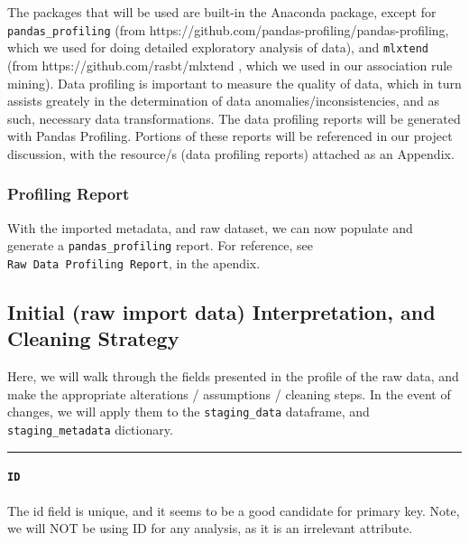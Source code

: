 \documentclass[11pt]{article}
\begin{document}
The packages that will be used are built-in the Anaconda package, except
for \texttt{pandas\_profiling} (from
https://github.com/pandas-profiling/pandas-profiling, which we used for
doing detailed exploratory analysis of data), and \texttt{mlxtend} (from
https://github.com/rasbt/mlxtend , which we used in our association rule
mining). Data profiling is important to measure the quality of data,
which in turn assists greately in the determination of data
anomalies/inconsistencies, and as such, necessary data transformations.
The data profiling reports will be generated with Pandas Profiling.
Portions of these reports will be referenced in our project discussion,
with the resource/s (data profiling reports) attached as an Appendix.

    \hypertarget{profiling-report}{%
\subsubsection{Profiling Report}\label{profiling-report}}

With the imported metadata, and raw dataset, we can now populate and
generate a \texttt{pandas\_profiling} report. For reference, see
\texttt{Raw\ Data\ Profiling\ Report}, in the apendix.

    

    \hypertarget{initial-raw-import-data-interpretation-and-cleaning-strategy}{%
\subsection{Initial (raw import data) Interpretation, and Cleaning
Strategy}\label{initial-raw-import-data-interpretation-and-cleaning-strategy}}

Here, we will walk through the fields presented in the profile of the
raw data, and make the appropriate alterations / assumptions / cleaning
steps. In the event of changes, we will apply them to the
\texttt{staging\_data} dataframe, and \texttt{staging\_metadata}
dictionary.

    \begin{center}\rule{0.5\linewidth}{0.5pt}\end{center}

\hypertarget{id}{%
\paragraph{\texorpdfstring{\texttt{ID}}{ID}}\label{id}}

The id field is unique, and it seems to be a good candidate for primary
key. Note, we will NOT be using ID for any analysis, as it is an
irrelevant attribute.
\end{document}

